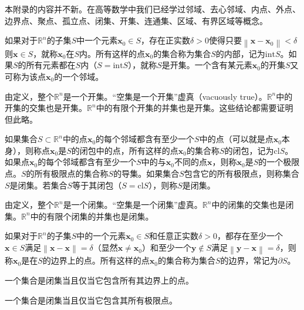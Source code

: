 \documentclass[main.tex]{subfiles}
\begin{document}
本附录的内容并不新。在高等数学中我们已经学过邻域、去心邻域、内点、外点、边界点、聚点、孤立点、闭集、开集、连通集、区域、有界区域等概念\cite[\S 7.1,p.1]{华工高数2009下}。

\begin{definition}[开集]
如果对于$\mathbb{R}^n$的子集$S$中一个元素$\mathbf{x}_0\in S$，存在正实数$\delta>0$使得只要$\left\|\mathbf{x}-\mathbf{x}_0\right\|<\delta$则$\mathbf{x}\in S$，就称$\mathbf{x}_0$在$S$内。所有这样的点$\mathbf{x}_0$的集合称为集合$S$的内部，记为$\mathrm{int}S$。如果$S$的所有元素都在$S$内（$S=\mathrm{int}S$），就称$S$是开集。一个含有某元素$\mathbf{x}_0$的开集$S$又可称为该点$\mathbf{x}_0$的一个邻域。
\end{definition}

由定义，整个$\mathbb{R}^n$是一个开集。“空集是一个开集”虚真（vacuously true）。$\mathbb{R}^n$中的开集的交集也是开集。$\mathbb{R}^n$中的有限个开集的并集也是开集。这些结论都需要证明但此略。

\begin{definition}[闭集]
如果集合$S\subset\mathbb{R}^n$中的点$\mathbf{x}_0$的每个邻域都含有至少一个$S$中的点（可以就是点$\mathbf{x}_0$本身），则称点$\mathbf{x}_0$是$S$的闭包中的点，所有这样的点$\mathbf{x}_0$的集合称$S$的闭包，记为$\mathrm{cl}S$。如果点$\mathbf{x}_0$的每个邻域都含有至少一个$S$中的与$\mathbf{x}_0$不同的点$\mathbf{x}$，则称$\mathbf{x}_0$是$S$的一个极限点。$S$的所有极限点的集合称$S$的导集。如果集合$S$包含它的所有极限点，则称集合$S$是闭集。若集合$S$等于其闭包（$S=\mathrm{cl}S$），则称$S$是闭集。
\end{definition}

由定义，整个$\mathbb{R}^n$是一个闭集。“空集是一个闭集”虚真。$\mathbb{R}^n$中的闭集的交集也是闭集。$\mathbb{R}^n$中的有限个闭集的并集也是闭集。

\begin{definition}[边界]
如果对于$\mathbb{R}^n$的子集$S$中的一个元素$\mathbf{x}_0\in S$和任意正实数$\delta>0$，都存在至少一个$\mathbf{x}\in S$满足$\left\|\mathbf{x}-\mathbf{x}\right\|=\delta$（显然$\mathbf{x}\neq\mathbf{x}_0$）和至少一个$\mathbf{y}\notin S$满足$\left\|\mathbf{y}-\mathbf{x}\right\|=\delta$，则称$\mathbf{x}_0$是在$S$的边界上的点。所有这样的点$\mathbf{x}_0$的集合称为集合$S$的边界，常记为$\partial S$。
\end{definition}

\begin{theorem}
一个集合是闭集当且仅当它包含所有其边界上的点。
\end{theorem}

\begin{corollary}
一个集合是闭集当且仅当它包含其所有极限点。
\end{corollary}
\end{document}
